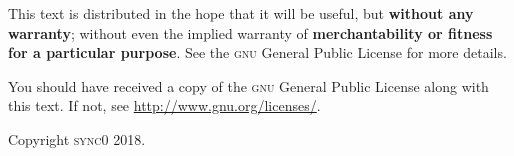 This text is distributed in the hope that it will be useful, but \textbf{without
any warranty}; without even the implied warranty of \textbf{merchantability or 
fitness for a particular purpose}. See the \textsc{gnu} General 
Public License for more details.

You should have received a copy of the \textsc{gnu} General Public License along
with this text. If not, see \url{http://www.gnu.org/licenses/}.

\vspace{1\baselineskip}
\noindent
Copyright \textcopyright \textsc{sync0} 2018. 




\newpage
\tableofcontents 